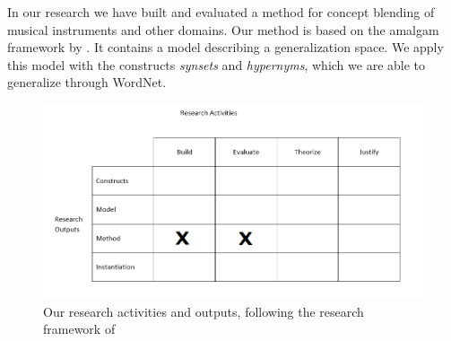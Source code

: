In our research we have built and evaluated a method for concept blending of musical instruments and other domains. Our method is based on the amalgam framework by \citet{ontanon2010amalgams}. It contains a model describing a generalization space. We apply this model with the constructs \emph{synsets} and \emph{hypernyms}, which we are able to generalize through WordNet. %

\begin{figure}
\centering
\includegraphics[width=1\linewidth]{"Figures/design science figur"}
\caption{Our research activities and outputs, following the research framework of \citet{march1995designfigure}}
\label{fig:design-science-figur}
\end{figure}


